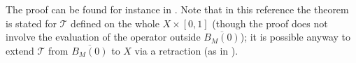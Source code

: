 \documentclass[10pt,a4paper,nouppercase,nowrite]{article}
\numberwithin{equation}{section}
\newcommand{\eps}{\varepsilon}
\theoremstyle{definition}
\begin{document}
		The proof can be found for instance in \cite[Theorem 11.6]{GT77}. Note that in this reference the theorem is stated for $\mathcal{T}$ defined on the whole $X \times [0,1]$ (though the proof does not involve the evaluation of the operator outside $\overline{B_M(0)}$); it is possible anyway to extend $\mathcal{T}$ from $\overline{B_M(0)}$ to $X$ via a retraction (as in \cite[Lemma 11.7]{GT77}).
		
\end{document}
